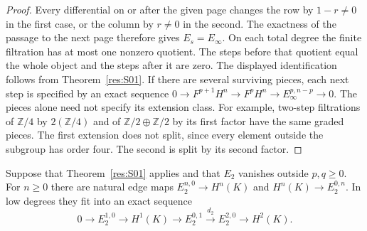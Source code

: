 \begin{proof}
Every differential on or after the given page changes the row
by $1-r\ne0$ in the first case, or the column by $r\ne0$ in the
second. The exactness of the passage to the next page therefore
gives $E_s=E_\infty$. On each total degree the finite filtration
has at most one nonzero quotient. The steps before that quotient
equal the whole object and the steps after it are zero. The
displayed identification follows from Theorem~\ref{res:S01}.
If there are several surviving pieces, each next step is
specified by an exact sequence
$0\to F^{p+1}H^n\to F^pH^n\to E_\infty^{p,n-p}\to0$.
The pieces alone need not specify its extension class.
For example, two-step filtrations of $\mathbb Z/4$ by
$2(\mathbb Z/4)$ and of $\mathbb Z/2\oplus\mathbb Z/2$ by its
first factor have the same graded pieces. The first extension does
not split, since every element outside the subgroup has order four.
The second is split by its second factor.
\end{proof}

\begin{theorem}
\label{res:S05}
Suppose that Theorem~\ref{res:S01} applies and that $E_2$ vanishes
outside $p,q\geq0$. For $n\geq0$ there are natural edge maps
$E_2^{n,0}\to H^n(K)$ and $H^n(K)\to E_2^{0,n}$.
In low degrees they fit into an exact sequence
\[
 0\longrightarrow E_2^{1,0}\longrightarrow H^1(K)
 \longrightarrow E_2^{0,1}\xrightarrow{d_2}
 E_2^{2,0}\longrightarrow H^2(K).
\]
\end{theorem}

